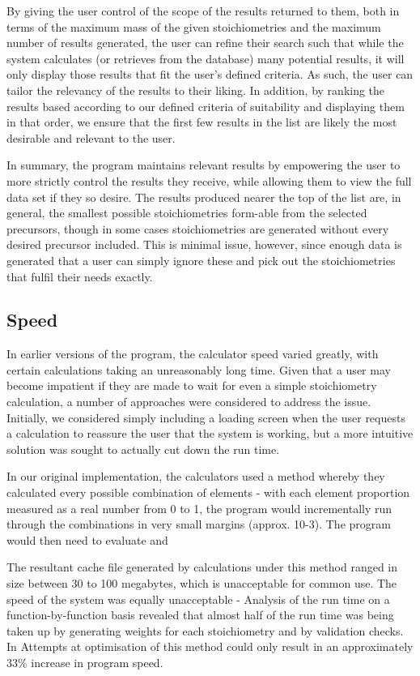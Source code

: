 By giving the user control of the scope of the results returned to them, both in terms of the maximum mass of the given stoichiometries and the maximum number of results generated, the user can refine their search such that while the system calculates (or retrieves from the database) many potential results, it will only display those results that fit the user’s defined criteria. As such, the user can tailor the relevancy of the results to their liking. In addition, by ranking the results based according to our defined criteria of suitability and displaying them in that order, we ensure that the first few results in the list are likely the most desirable and relevant to the user.

In summary, the program maintains relevant results by empowering the user to more strictly control the results they receive, while allowing them to view the full data set if they so desire. The results produced nearer the top of the list are, in general, the smallest possible stoichiometries form-able from the selected precursors, though in some cases stoichiometries are generated without every desired precursor included. This is minimal issue, however, since enough data is generated that a user can simply ignore these and pick out the stoichiometries that fulfil their needs exactly.

\subsection{Speed}
In earlier versions of the program, the calculator speed varied greatly, with certain calculations taking an unreasonably long time. Given that a user may become impatient if they are made to wait for even a simple stoichiometry calculation, a number of approaches were considered to address the issue. Initially, we considered simply including a loading screen when the user requests a calculation to reassure the user that the system is working, but a more intuitive solution was sought to actually cut down the run time.

In our original implementation, the calculators used a method whereby they calculated every possible combination of elements - with each element proportion measured as a real number from 0 to 1, the program would incrementally run through the combinations in very small margins (approx. 10-3). The program would then need to evaluate and 

The resultant cache file generated by calculations under this method ranged in size between 30 to 100 megabytes, which is unacceptable for common use. The speed of the system was equally unacceptable - Analysis of the run time on a function-by-function basis revealed that almost half of the run time was being taken up by generating weights for each stoichiometry and by validation checks. In  Attempts at optimisation of this method could only result in an approximately 33\% increase in program speed.

